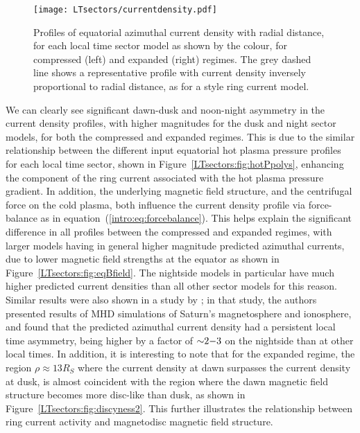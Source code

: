 \begin{figure}
\centering
\texttt{[image: LTsectors/currentdensity.pdf]}
\caption[Model equatorial profiles of azimuthal current density for different local time sectors, for compressed and expanded regimes.]{Profiles of equatorial azimuthal current density with radial distance, for each local time sector model as shown by the colour, for compressed (left) and expanded (right) regimes. The grey dashed line shows a representative profile with current density inversely proportional to radial distance, as for a \citet{connerney1981b, connerney1983} style ring current model.}
\label{LTsectors:fig:currentdensity}
\end{figure}

We can clearly see significant dawn-dusk and noon-night asymmetry in the current density profiles, with higher magnitudes for the dusk and night sector models, for both the compressed and expanded regimes. This is due to the similar relationship between the different input equatorial hot plasma pressure profiles for each local time sector, shown in Figure~\ref{LTsectors:fig:hotPpolys}, enhancing the component of the ring current associated with the hot plasma pressure gradient. In addition, the underlying magnetic field structure, and the centrifugal force on the cold plasma, both influence the current density profile via force-balance as in equation~(\ref{intro:eq:forcebalance}). This helps explain the significant difference in all profiles between the compressed and expanded regimes, with larger models having in general higher magnitude predicted azimuthal currents, due to lower magnetic field strengths at the equator as shown in Figure~\ref{LTsectors:fig:eqBfield}. The nightside models in particular have much higher predicted current densities than all other sector models for this reason. Similar results were also shown in a study by \citet{jia2012a}; in that study, the authors presented results of MHD simulations of Saturn's magnetosphere and ionosphere, and found that the predicted azimuthal current density had a persistent local time asymmetry, being higher by a factor of ${\sim}2{\--}3$ on the nightside than at other local times. In addition, it is interesting to note that for the expanded regime, the region $\rho \approx {13}{R_S}$ where the current density at dawn surpasses the current density at dusk, is almost coincident with the region where the dawn magnetic field structure becomes more disc-like than dusk, as shown in Figure~\ref{LTsectors:fig:discyness2}. This further illustrates the relationship between ring current activity and magnetodisc magnetic field structure.

